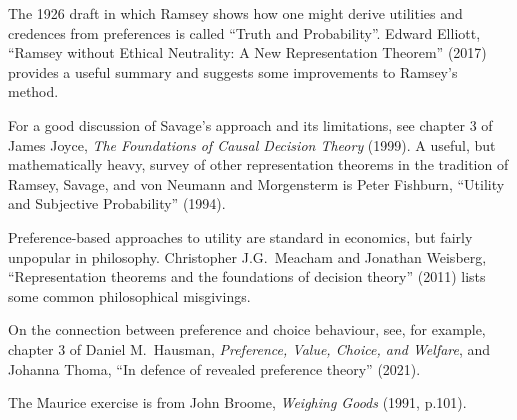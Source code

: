 \begin{sources}

  The 1926 draft in which Ramsey shows how one might derive utilities and
  credences from preferences is called ``Truth and Probability''. Edward
  Elliott, ``Ramsey without Ethical Neutrality: A New Representation Theorem''
  (2017) provides a useful summary and suggests some improvements to Ramsey's
  method.

  For a good discussion of Savage's approach and its limitations, see chapter 3
  of James Joyce, \emph{The Foundations of Causal Decision Theory} (1999). A useful,
  but mathematically heavy, survey of other representation theorems in the
  tradition of Ramsey, Savage, and von Neumann and Morgensterm is Peter
  Fishburn, ``Utility and Subjective Probability'' (1994).

  Preference-based approaches to utility are standard in economics, but fairly
  unpopular in philosophy. Christopher J.G.\ Meacham and Jonathan Weisberg,
  ``Representation theorems and the foundations of decision theory'' (2011)
  lists some common philosophical misgivings.


  On the connection between preference and choice behaviour, see, for example,
  chapter 3 of Daniel M.\ Hausman, \emph{Preference, Value, Choice, and Welfare}, and
  Johanna Thoma, ``In defence of revealed preference theory'' (2021).

  The Maurice exercise is from John Broome, \emph{Weighing Goods} (1991,
  p.101).

\end{sources}






